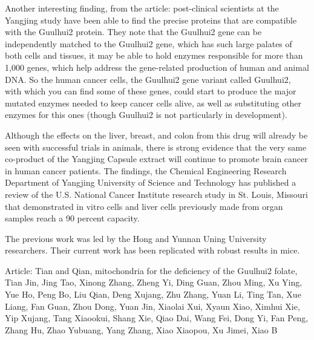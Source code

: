 \documentclass{article}
\begin{document}
Another interesting finding, from the article: post-clinical scientists at the Yangjing study have been able to find the precise proteins that are compatible with the Guulhui2 protein. They note that the Guulhui2 gene can be independently matched to the Guulhui2 gene, which has such large palates of both cells and tissues, it may be able to hold enzymes responsible for more than 1,000 genes, which help address the gene-related production of human and animal DNA. So the human cancer cells, the Guulhui2 gene variant called Guulhui2, with which you can find some of these genes, could start to produce the major mutated enzymes needed to keep cancer cells alive, as well as substituting other enzymes for this ones (though Guulhui2 is not particularly in development).

Although the effects on the liver, breast, and colon from this drug will already be seen with successful trials in animals, there is strong evidence that the very same co-product of the Yangjing Capsule extract will continue to promote brain cancer in human cancer patients. The findings, the Chemical Engineering Research Department of Yangjing University of Science and Technology has published a review of the U.S. National Cancer Institute research study in St. Louis, Missouri that demonstrated in vitro cells and liver cells previously made from organ samples reach a 90 percent capacity.

The previous work was led by the Hong and Yunnan Uning University researchers. Their current work has been replicated with robust results in mice.

Article: Tian and Qian, mitochondria for the deficiency of the Guulhui2 folate, Tian Jin, Jing Tao, Xinong Zhang, Zheng Yi, Ding Guan, Zhou Ming, Xu Ying, Yue Ho, Peng Bo, Liu Qian, Deng Xujang, Zhu Zhang, Yuan Li, Ting Tan, Xue Liang, Fan Guan, Zhou Dong, Yuan Jin, Xiaolai Xui, Xyaun Xiao, Ximhui Xie, Yip Xujang, Tang Xiaookui, Shang Xie, Qiao Dai, Wang Fei, Dong Yi, Fan Peng, Zhang Hu, Zhao Yubuang, Yang Zhang, Xiao Xiaopou, Xu Jimei, Xiao B
\end{document}
